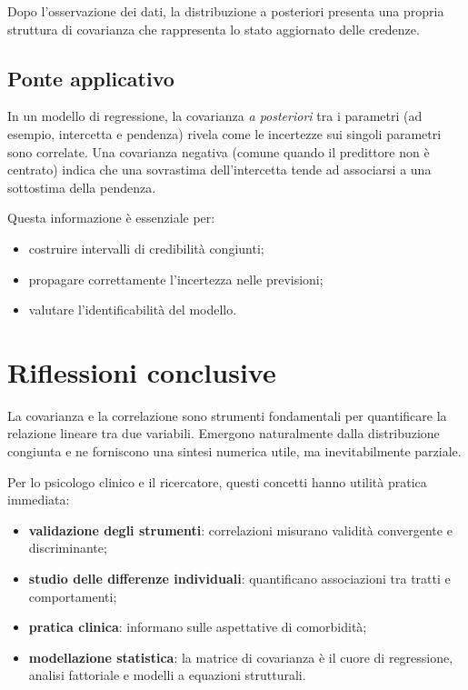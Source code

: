 \documentclass[
  italian,
  letterpaper,
  a4paper,
  11pt,
  open=any]{scrbook}
\providecommand{\tightlist}{%
  \setlength{\itemsep}{0pt}\setlength{\parskip}{0pt}}
\theoremstyle{plain}
\theoremstyle{definition}
\theoremstyle{definition}
\theoremstyle{remark}
\begin{document}
Dopo l'osservazione dei dati, la distribuzione a posteriori presenta una
propria struttura di covarianza che rappresenta lo stato aggiornato
delle credenze.

\subsection{Ponte applicativo}\label{ponte-applicativo-1}

In un modello di regressione, la covarianza \emph{a posteriori} tra i
parametri (ad esempio, intercetta e pendenza) rivela come le incertezze
sui singoli parametri sono correlate. Una covarianza negativa (comune
quando il predittore non è centrato) indica che una sovrastima
dell'intercetta tende ad associarsi a una sottostima della pendenza.

Questa informazione è essenziale per:

\begin{itemize}
\tightlist
\item
  costruire intervalli di credibilità congiunti;
\item
  propagare correttamente l'incertezza nelle previsioni;
\item
  valutare l'identificabilità del modello.
\end{itemize}

\section*{Riflessioni conclusive}\label{riflessioni-conclusive-8}


La covarianza e la correlazione sono strumenti fondamentali per
quantificare la relazione lineare tra due variabili. Emergono
naturalmente dalla distribuzione congiunta e ne forniscono una sintesi
numerica utile, ma inevitabilmente parziale.

Per lo psicologo clinico e il ricercatore, questi concetti hanno utilità
pratica immediata:

\begin{itemize}
\tightlist
\item
  \textbf{validazione degli strumenti}: correlazioni misurano validità
  convergente e discriminante;
\item
  \textbf{studio delle differenze individuali}: quantificano
  associazioni tra tratti e comportamenti;
\item
  \textbf{pratica clinica}: informano sulle aspettative di comorbidità;
\item
  \textbf{modellazione statistica}: la matrice di covarianza è il cuore
  di regressione, analisi fattoriale e modelli a equazioni strutturali.
\end{itemize}
\end{document}
